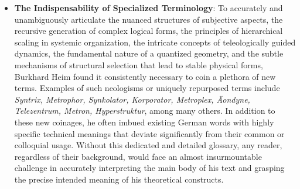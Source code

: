 \documentclass[12pt]{article}
\begin{document}
\begin{itemize}
    \item \textbf{The Indispensability of Specialized Terminology}:
    To accurately and unambiguously articulate the nuanced structures of subjective aspects, the recursive generation of complex logical forms, the principles of hierarchical scaling in systemic organization, the intricate concepts of teleologically guided dynamics, the fundamental nature of a quantized geometry, and the subtle mechanisms of structural selection that lead to stable physical forms, Burkhard Heim found it consistently necessary to coin a plethora of new terms. Examples of such neologisms or uniquely repurposed terms include \textit{Syntrix, Metrophor, Synkolator, Korporator, Metroplex, Äondyne, Telezentrum, Metron, Hyperstruktur}, among many others. In addition to these new coinages, he often imbued existing German words with highly specific technical meanings that deviate significantly from their common or colloquial usage. Without this dedicated and detailed glossary, any reader, regardless of their background, would face an almost insurmountable challenge in accurately interpreting the main body of his text and grasping the precise intended meaning of his theoretical constructs.


\end{itemize}
\end{document}
